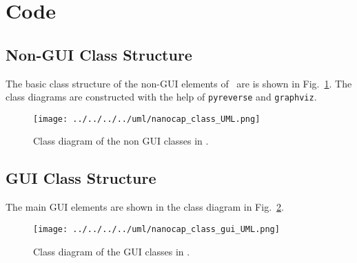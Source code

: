 \section{Code}\label{Code}

\subsection{Non-GUI Class Structure}

The basic class structure of the non-GUI elements of \nanocap~are is shown in Fig.~\ref{ClassUML}.  The class diagrams are constructed with the help of \texttt{pyreverse} and \texttt{graphviz}.

 \begin{figure}[!h]
\centering
\texttt{[image: ../../../../uml/nanocap\_class\_UML.png]}
\caption{Class diagram of the non GUI classes in \nanocap.}
\label{ClassUML}
\end{figure}

\subsection{GUI Class Structure}

The main GUI elements are shown in the class diagram in Fig.~\ref{ClassUMLgui}.

 \begin{figure}[!h]
\centering
\texttt{[image: ../../../../uml/nanocap\_class\_gui\_UML.png]}
\caption{Class diagram of the GUI classes in \nanocap.}
\label{ClassUMLgui}
\end{figure}